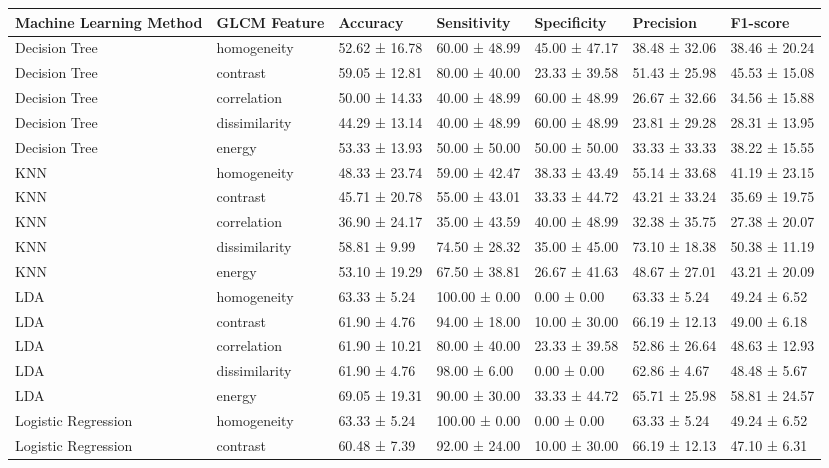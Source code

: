 \begin{tabular}{lllllll}
\toprule
Machine Learning Method & GLCM Feature & Accuracy & Sensitivity & Specificity & Precision & F1-score \\
\midrule
Decision Tree & homogeneity & 52.62 ± 16.78 & 60.00 ± 48.99 & 45.00 ± 47.17 & 38.48 ± 32.06 & 38.46 ± 20.24 \\
Decision Tree & contrast & 59.05 ± 12.81 & 80.00 ± 40.00 & 23.33 ± 39.58 & 51.43 ± 25.98 & 45.53 ± 15.08 \\
Decision Tree & correlation & 50.00 ± 14.33 & 40.00 ± 48.99 & 60.00 ± 48.99 & 26.67 ± 32.66 & 34.56 ± 15.88 \\
Decision Tree & dissimilarity & 44.29 ± 13.14 & 40.00 ± 48.99 & 60.00 ± 48.99 & 23.81 ± 29.28 & 28.31 ± 13.95 \\
Decision Tree & energy & 53.33 ± 13.93 & 50.00 ± 50.00 & 50.00 ± 50.00 & 33.33 ± 33.33 & 38.22 ± 15.55 \\
KNN & homogeneity & 48.33 ± 23.74 & 59.00 ± 42.47 & 38.33 ± 43.49 & 55.14 ± 33.68 & 41.19 ± 23.15 \\
KNN & contrast & 45.71 ± 20.78 & 55.00 ± 43.01 & 33.33 ± 44.72 & 43.21 ± 33.24 & 35.69 ± 19.75 \\
KNN & correlation & 36.90 ± 24.17 & 35.00 ± 43.59 & 40.00 ± 48.99 & 32.38 ± 35.75 & 27.38 ± 20.07 \\
KNN & dissimilarity & 58.81 ± 9.99 & 74.50 ± 28.32 & 35.00 ± 45.00 & 73.10 ± 18.38 & 50.38 ± 11.19 \\
KNN & energy & 53.10 ± 19.29 & 67.50 ± 38.81 & 26.67 ± 41.63 & 48.67 ± 27.01 & 43.21 ± 20.09 \\
LDA & homogeneity & 63.33 ± 5.24 & 100.00 ± 0.00 & 0.00 ± 0.00 & 63.33 ± 5.24 & 49.24 ± 6.52 \\
LDA & contrast & 61.90 ± 4.76 & 94.00 ± 18.00 & 10.00 ± 30.00 & 66.19 ± 12.13 & 49.00 ± 6.18 \\
LDA & correlation & 61.90 ± 10.21 & 80.00 ± 40.00 & 23.33 ± 39.58 & 52.86 ± 26.64 & 48.63 ± 12.93 \\
LDA & dissimilarity & 61.90 ± 4.76 & 98.00 ± 6.00 & 0.00 ± 0.00 & 62.86 ± 4.67 & 48.48 ± 5.67 \\
LDA & energy & 69.05 ± 19.31 & 90.00 ± 30.00 & 33.33 ± 44.72 & 65.71 ± 25.98 & 58.81 ± 24.57 \\
Logistic Regression & homogeneity & 63.33 ± 5.24 & 100.00 ± 0.00 & 0.00 ± 0.00 & 63.33 ± 5.24 & 49.24 ± 6.52 \\
Logistic Regression & contrast & 60.48 ± 7.39 & 92.00 ± 24.00 & 10.00 ± 30.00 & 66.19 ± 12.13 & 47.10 ± 6.31 \\

\end{tabular}
